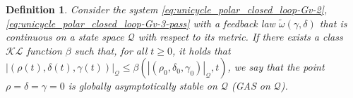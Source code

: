 \documentclass[journal,twoside,web]{ieeecolor}
\newcommand{\xmark}{\ding{55}}%
\newtheorem{definition}{Definition}
\theoremstyle{definition}
\begin{document}
\begin{table}[t]



    \caption{Representative CLFs for the unicycle~\eqref{eq:unicycle_polar_closed_loop-Gv-1} on each of the state-spaces $\hat{\mathcal{S}} \in \{\mathcal{S}, \mathcal{S}_1, \mathcal{S}_2, \mathcal{S}_3\}$ defined in \eqref{eq:ss_S}--\eqref{eq:ss_S3}.}
    \label{tab:CLF}
\end{table}

\begin{definition}
\label{def-our-GAS}
Consider the system \eqref{eq:unicycle_polar_closed_loop-Gv-2}, \eqref{eq:unicycle_polar_closed_loop-Gv-3-pass} with a feedback law $\tilde\omega(\gamma,\delta)$ that is continuous on a state space $\mathcal{Q}$ with respect to its metric. 
If there exists a class $\mathcal{KL}$ function $\beta$ such that, for all $t\geq 0$, it holds that $|(\rho(t),\delta(t), \gamma(t))|_{\mathcal{Q}}\leq \beta\left(|(\rho_0,\delta_0, \gamma_0)|_{\mathcal{Q}},t\right)$, we say that the 
point $\rho=\delta = \gamma=0$ is {\em globally asymptotically stable on $\mathcal{Q}$} (GAS on $\mathcal{Q}$). 
\end{definition}
\end{document}
